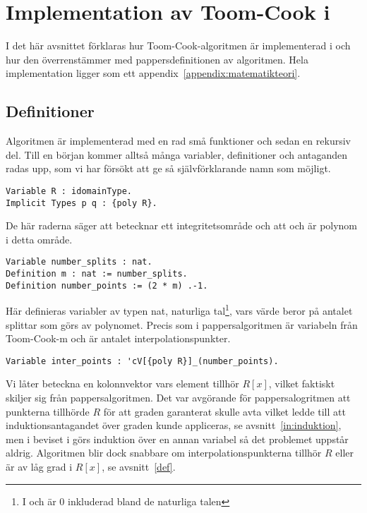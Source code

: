 \section{Implementation av Toom-Cook i \coq{}}
\label{sec:formellimplementation}
I det här avsnittet förklaras hur Toom-Cook-algoritmen är implementerad i \ssr{}
och hur den överrenstämmer med pappersdefinitionen av algoritmen. Hela
implementation ligger som ett appendix~\ref{appendix:matematikteori}.

\subsection{Definitioner}
Algoritmen är implementerad med en rad små funktioner och sedan en rekursiv
del. Till en början kommer alltså många variabler, definitioner och antaganden
radas upp, som vi har försökt att ge så självförklarande namn som möjligt.

\begin{lstlisting}
Variable R : idomainType.
Implicit Types p q : {poly R}.
\end{lstlisting}

De här raderna säger att  betecknar ett integritetsområde och att 
och  är polynom i detta område.

\begin{lstlisting}
Variable number_splits : nat.
Definition m : nat := number_splits.
Definition number_points := (2 * m) .-1.
\end{lstlisting}

Här definieras variabler av typen nat, naturliga tal\footnote{I \coq{} och \ssr{}
är 0 inkluderad bland de naturliga talen}, vars värde beror på antalet splittar
som görs av polynomet. Precis som i pappersalgoritmen är  variabeln från
Toom-Cook-m och  är antalet interpolationspunkter.

\begin{lstlisting}
Variable inter_points : 'cV[{poly R}]_(number_points).
\end{lstlisting}

Vi låter  beteckna en kolonnvektor vars element tillhör $R[x]$,
vilket faktiskt skiljer sig från pappersalgoritmen. Det var avgörande för
pappersalogritmen att punkterna tillhörde $R$ för att graden garanterat skulle
avta vilket ledde till att induktionsantagandet över graden kunde appliceras,
se avsnitt~\ref{in:induktion}, men i beviset i\ssr{} görs induktion över en annan
variabel så det problemet uppstår aldrig. Algoritmen blir dock snabbare om
interpolationspunkterna tillhör $R$ eller är av låg grad i $R[x]$, se
avsnitt~\ref{def}.

